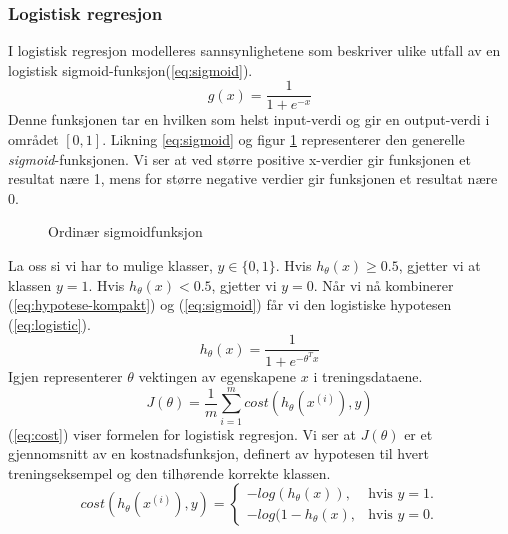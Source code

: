 \subsubsection*{Logistisk regresjon}
I logistisk regresjon modelleres sannsynlighetene som beskriver ulike utfall av en logistisk sigmoid-funksjon(\ref{eq:sigmoid}).
\begin{equation}
g(x) = \frac{1}{1 + e^{-x}}
\label{eq:sigmoid}
\end{equation}
Denne funksjonen tar en hvilken som helst input-verdi og gir en output-verdi i området \([0,1]\). Likning \ref{eq:sigmoid} og figur \ref{figure:sigmoid} representerer den generelle \emph{sigmoid}-funksjonen. Vi ser at ved større positive x-verdier gir funksjonen et resultat nære 1, mens for større negative verdier gir funksjonen et resultat nære 0.
\begin{figure}[h!]
\centering
{}
\caption{Ordinær sigmoidfunksjon}
\label{figure:sigmoid}
\end{figure}
La oss si vi har to mulige klasser, \(y \in \{0,1\}\). Hvis \( h_\theta(x) \geq  0.5\), gjetter vi at klassen \(y = 1\). Hvis \( h_\theta(x) < 0.5\), gjetter vi \(y = 0\). Når vi nå kombinerer (\ref{eq:hypotese-kompakt}) og (\ref{eq:sigmoid}) får vi den logistiske hypotesen (\ref{eq:logistic}).
\begin{equation}
h_\theta(x) = \frac{1}{1 + e^{-\theta^{T}x}}
\label{eq:logistic}
\end{equation}
Igjen representerer $\theta$ vektingen av egenskapene $x$ i treningsdataene. 
\begin{equation}
J(\theta) = 
    \frac{1}{m} \sum_{i=1}^{m} cost(h_\theta(x^{(i)}), y)
\label{eq:cost}
\end{equation}
(\ref{eq:cost}) viser formelen for logistisk regresjon. Vi ser at $J(\theta)$ er et gjennomsnitt av en kostnadsfunksjon, definert av hypotesen til hvert treningseksempel og den tilhørende korrekte klassen. 
\begin{equation}
    cost(h_\theta(x^{(i)}), y) = \begin{cases}
    -log(h_\theta(x)), & \text{hvis $y=1$}.\\
    -log(1-h_\theta(x), & \text{hvis $y=0$}.
  \end{cases}
  \label{eq:costdetail}
\end{equation}
